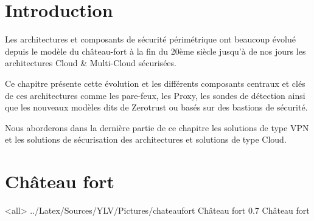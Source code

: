 \section{Introduction}
Les architectures et composants de sécurité périmétrique ont beaucoup évolué depuis le modèle du château-fort à la fin du 20ème siècle jusqu'à de nos jours les architectures Cloud \& Multi-Cloud sécurisées.

Ce chapitre présente cette évolution et les différents composants centraux et clés de ces architectures comme les pare-feux, les Proxy, les sondes de détection ainsi que les nouveaux modèles dits de Zerotrust ou basés sur des bastions de sécurité.

Nous aborderons dans la dernière partie de ce chapitre les solutions de type VPN et les solutions de sécurisation des architectures et solutions de type Cloud.

\section{Château fort}


\mode<all>{\picframe
{../Latex/Sources/YLV/Pictures/chateaufort}%
{Château fort} %
{0.7} %
{Château fort} %
}

